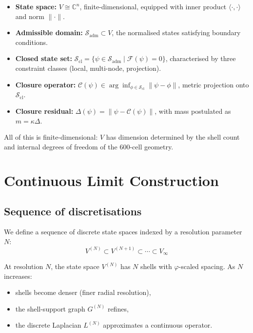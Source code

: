\documentclass[12pt]{article}
\newcommand{\Ccal}{\mathcal{C}}
\newcommand{\Fcal}{\mathcal{F}}
\newcommand{\Sadm}{\mathcal{S}_{\mathrm{adm}}}
\newcommand{\Scl}{\mathcal{S}_{\mathrm{cl}}}
\newcommand{\phig}{\varphi}
\begin{document}
\begin{itemize}
    \item \textbf{State space:} $V \cong \mathbb{C}^n$, finite-dimensional, equipped with inner product $\langle\cdot,\cdot\rangle$ and norm $\|\cdot\|$.
    \item \textbf{Admissible domain:} $\Sadm \subset V$, the normalised states satisfying boundary conditions.
    \item \textbf{Closed state set:} $\Scl = \{\psi \in \Sadm \mid \Fcal(\psi) = 0\}$, characterised by three constraint classes (local, multi-node, projection).
    \item \textbf{Closure operator:} $\Ccal(\psi) \in \arg\inf_{\phi \in \Scl} \|\psi - \phi\|$, metric projection onto $\Scl$.
    \item \textbf{Closure residual:} $\Delta(\psi) = \|\psi - \Ccal(\psi)\|$, with mass postulated as $m = \kappa\Delta$.
\end{itemize}

All of this is finite-dimensional: $V$ has dimension determined by the shell count and internal degrees of freedom of the 600-cell geometry.

\section{Continuous Limit Construction}\label{sec:limit}

\subsection{Sequence of discretisations}

We define a sequence of discrete state spaces indexed by a resolution parameter $N$:
\begin{equation}
    V^{(N)} \subset V^{(N+1)} \subset \cdots \subset V_\infty
\end{equation}

At resolution $N$, the state space $V^{(N)}$ has $N$ shells with $\phig$-scaled spacing. As $N$ increases:
\begin{itemize}
    \item shells become denser (finer radial resolution),
    \item the shell-support graph $G^{(N)}$ refines,
    \item the discrete Laplacian $L^{(N)}$ approximates a continuous operator.
\end{itemize}
\end{document}
